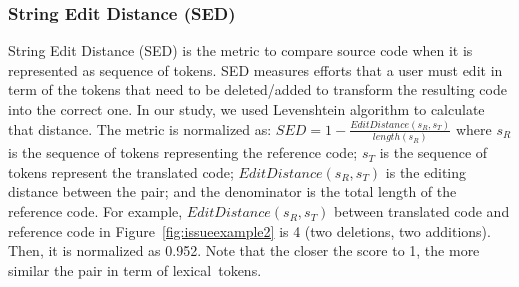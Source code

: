 \subsubsection{\textbf{String Edit Distance (SED)}}
String Edit Distance (SED) is the metric to compare source code when
it is represented as sequence of tokens. SED measures efforts that a
user must edit in term of the tokens that need to be deleted/added to
transform the resulting code into the correct one. In our study, we
used Levenshtein algorithm to calculate that distance. The metric is
normalized as: $SED = 1 - \frac{EditDistance\left(s_R,
  s_T\right)}{length\left(s_R\right)}$ where $s_R$ is the sequence of
tokens representing the reference code; $s_T$ is the sequence of
tokens represent the translated code; $EditDistance\left(s_R,
s_T\right)$ is the editing distance between the pair; and the
denominator is the total length of the reference code. For example,
$EditDistance\left(s_R, s_T\right)$ between translated code and
reference code in Figure~\ref{fig:issueexample2} is 4 (two deletions,
two additions). Then, it is normalized as 0.952. Note that the closer
the score to 1, the more similar the pair in term of lexical~tokens.




 

